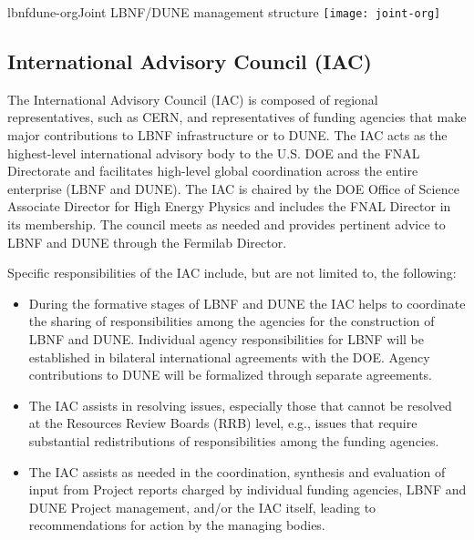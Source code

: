 \begin{cdrfigure}{lbnfdune-org}{Joint LBNF/DUNE management structure}
\texttt{[image: joint-org]}
\end{cdrfigure}

\subsection{International Advisory Council (IAC) }

The International Advisory Council (IAC) is composed of
regional representatives, such as CERN, and representatives of
funding agencies that make major contributions to LBNF infrastructure or to DUNE. The IAC 
acts as the highest-level international advisory body to the U.S.
DOE and the FNAL Directorate and facilitates
high-level global coordination across the entire enterprise (LBNF and DUNE).
The IAC is chaired by the DOE Office of Science Associate Director
for High Energy Physics and includes the FNAL Director in its membership.  
The council meets as needed and provides pertinent advice to 
LBNF and DUNE  
through the Fermilab Director.  


Specific responsibilities of the IAC include, but are not limited to,
the following:


\begin{itemize}
\item During the formative stages of LBNF and DUNE
the IAC helps to coordinate the sharing of responsibilities among
the agencies for the construction of LBNF and DUNE.
Individual agency responsibilities for LBNF will be established in
bilateral international agreements with the DOE. Agency contributions to
DUNE will be formalized through separate agreements.

\item The IAC assists in resolving issues, especially those
that cannot be resolved at the Resources Review Boards (RRB) level,
e.g., issues that require substantial redistributions of
responsibilities among the funding agencies.

\item The IAC assists as needed in the coordination,
synthesis and evaluation of input from Project reports charged by
individual funding agencies, LBNF and DUNE Project management,
and/or the IAC itself, leading to recommendations for action by
the managing bodies.
\end{itemize}

